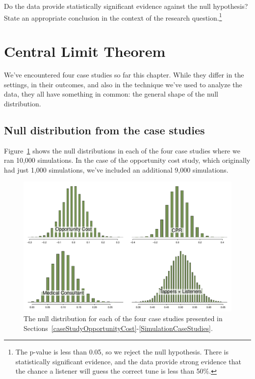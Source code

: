 \begin{exercise}
Do the data provide statistically significant evidence against the null hypothesis? State an appropriate conclusion in the context of the research question.\footnote{The p-value is less than 0.05, so we reject the null hypothesis. There is statistically significant evidence, and the data provide strong evidence that the chance a listener will guess the correct tune is less than 50\%.}
\end{exercise}


\textPE{\newpage}


\section{Central Limit Theorem}
\label{CLTsection}

We've encountered four case studies so far this chapter. While they differ in the settings, in their outcomes, and also in the technique we've used to analyze the data, they all have something in common: the general shape of the null distribution.

\subsection{Null distribution from the case studies}

Figure~\ref{FourCaseStudies} shows the null distributions in each of the four case studies where we ran 10,000 simulations. In the case of the opportunity cost study, which originally had just 1,000 simulations, we've included an additional 9,000 simulations.

\begin{figure}[ht]
\centering
\includegraphics[width=\textwidth]{02/figures/FourCaseStudies/FourCaseStudies}
\caption{The null distribution for each of the four case studies presented in Sections~\ref{caseStudyOpportunityCost}-\ref{SimulationCaseStudies}.}
\label{FourCaseStudies}
\end{figure}

